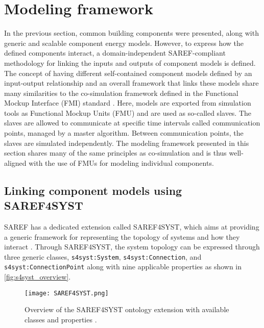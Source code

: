 \section{Modeling framework}
\label{sec:topology}

In the previous section, common building components were presented, along with generic and scalable component energy models. However, to express how the defined components interact, a domain-independent SAREF-compliant methodology for linking the inputs and outputs of component models is defined. The concept of having different self-contained component models defined by an input-output relationship and an overall framework that links these models share many similarities to the co-simulation framework defined in the Functional Mockup Interface (FMI) standard \cite{Blochwitz2011}. Here, models are exported from simulation tools as Functional Mockup Units (FMU) and are used as so-called slaves. The slaves are allowed to communicate at specific time intervals called communication points, managed by a master algorithm. Between communication points, the slaves are simulated independently. The modeling framework presented in this section shares many of the same principles as co-simulation and is thus well-aligned with the use of FMUs for modeling individual components.  

\subsection{Linking component models using SAREF4SYST}

SAREF has a dedicated extension called SAREF4SYST, which aims at providing a generic framework for representing the topology of systems and how they interact \cite{lefran2019a}. Through SAREF4SYST, the system topology can be expressed through three generic classes, \texttt{s4syst:System}, \texttt{s4syst:Connection}, and \texttt{s4syst:ConnectionPoint} along with nine applicable properties as shown in \autoref{fig:s4syst_overview}. 

\begin{figure}[h]
    \centering
    \texttt{[image: SAREF4SYST.png]}
    \caption{Overview of the SAREF4SYST ontology extension with available classes and properties \cite{lefran2019a}.}
    \label{fig:s4syst_overview}
\end{figure}

